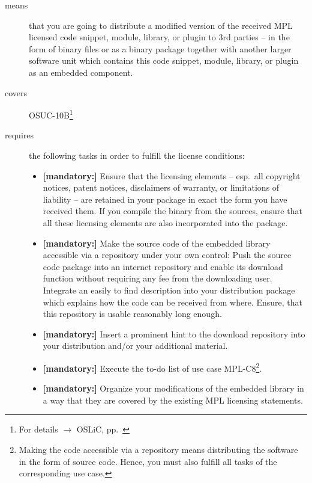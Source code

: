 \begin{description}
\item[means] that you are going to distribute a modified version of the received
MPL licensed code snippet, module, library, or plugin to 3rd parties -- in the
form of binary files or as a binary package together with another larger
software unit which contains this code snippet, module, library, or plugin as an
embedded component.
\item[covers] OSUC-10B\footnote{For details $\rightarrow$ OSLiC, pp.\
\pageref{OSUC-10B-DEF}}
\item[requires] the following tasks in order to fulfill the license conditions:
\begin{itemize}

  \item \textbf{[mandatory:]} Ensure that the licensing elements -- esp.\ all
  copyright notices, patent notices, disclaimers of warranty, or limitations of
  liability -- are retained in your package in exact the form you have received
  them. If you compile the binary from the sources, ensure that all these
  licensing elements are also incorporated into the package.

  \item \textbf{[mandatory:]} Make the source code of the embedded library
  accessible via a repository under your own control: Push the source code
  package into an internet repository and enable its download function without
  requiring any fee from the downloading user. Integrate an easily to find
  description into your distribution package which explains how the code can be
  received from where. Ensure, that this repository is usable reasonably long
  enough.
  
  \item \textbf{[mandatory:]} Insert a prominent hint to the download repository
  into your distribution and/or your additional material.

  \item \textbf{[mandatory:]} Execute the to-do list of use case MPL-C8\footnote{
  Making the code accessible via a repository means distributing the software in
  the form of source code. Hence, you must also fulfill all tasks of the
  corresponding use case.}.

  \item \textbf{[mandatory:]} Organize your modifications of the embedded
  library in a way that they are covered by the existing MPL licensing
  statements. 
    

\end{itemize}
\end{description}
